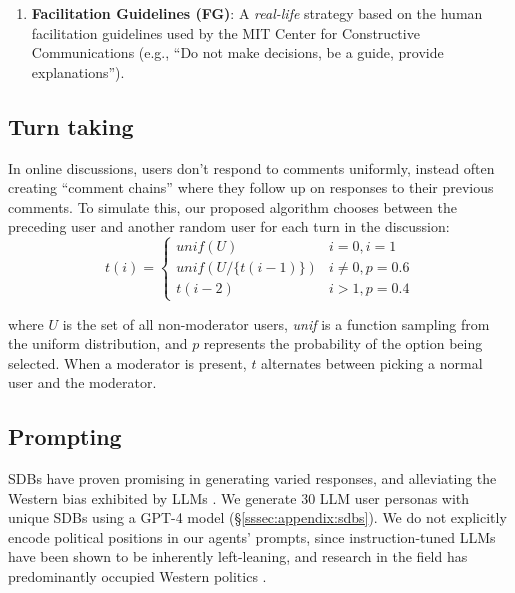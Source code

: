 \begin{enumerate}
    \item \textbf{Facilitation Guidelines (FG)}: A \emph{real-life} strategy based on the human facilitation guidelines used by the MIT Center for Constructive Communications \cite{dimitra-book} (e.g., “Do not make decisions, be a guide, provide explanations”). %
\end{enumerate}


\subsection{Turn taking}
\label{ssec:experimental:turn}

In online discussions, users don't respond to comments uniformly, instead often creating ``comment chains'' where they follow up on responses to their previous comments. To simulate this, our proposed algorithm chooses between the preceding user and another random user for each turn in the discussion:
\small
\begin{equation}
\label{eq:turn_taking}
    t(i) = \left\{
\begin{array}{ll}
    \textit{unif}(U) & i=0, i=1\\
    \textit{unif}(U/\{t(i-1)\}) & i \neq 0, p=0.6 \\
    t(i-2) & i > 1, p=0.4 
\end{array} 
\right.
\end{equation}
\normalsize

\noindent where $U$ is the set of all non-moderator users, \textit{unif} is a function sampling from the uniform distribution, and $p$ represents the probability of the option being selected. When a moderator is present, $t$ alternates between picking a normal user and the moderator.


\subsection{Prompting}
\label{ssec:experimental:prompts}

\acp{SDB} have proven promising in generating varied responses, and alleviating the Western bias exhibited by \acp{LLM} \cite{burton2024large}. We generate 30 \ac{LLM} user personas with unique \acp{SDB} using a GPT-4 model \cite{openai2024gpt4technicalreport} (\S\ref{sssec:appendix:sdbs}). We do not explicitly encode political positions in our agents' prompts, since instruction-tuned \acp{LLM} have been shown to be inherently left-leaning, and research in the field has predominantly occupied Western politics \cite{Taubenfeld2024SystematicBI, potter-etal-2024-hidden, political_2024, pit2024oninvestigatingpoliticalstance}. %

